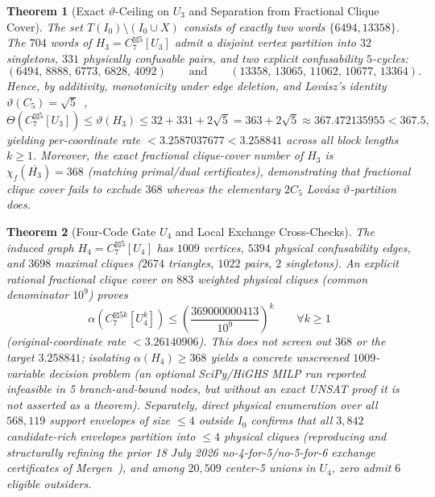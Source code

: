 \documentclass[11pt,letterpaper]{article}
\newtheorem{theorem}{Theorem}[section]
\theoremstyle{definition}
\theoremstyle{remark}
\newcommand{\ThetaCap}{\Theta}
\newcommand{\varthetaL}{\vartheta}
\begin{document}
\begin{theorem}[Exact $\varthetaL$-Ceiling on $U_3$ and Separation from Fractional Clique Cover]\label{thm:u3}
The set $T(I_0) \setminus (I_0 \cup X)$ consists of exactly two words $\{6494, 13358\}$. The $704$ words of $H_3 = C_7^{\boxtimes 5}[U_3]$ admit a disjoint vertex partition into $32$ singletons, $331$ physically confusable pairs, and two explicit confusability $5$-cycles:
\[
  (6494,\, 8888,\, 6773,\, 6828,\, 4092) \qquad \text{and} \qquad (13358,\, 13065,\, 11062,\, 10677,\, 13364).
\]
Hence, by additivity, monotonicity under edge deletion, and Lov\'asz's identity $\varthetaL(C_5)=\sqrt{5}$~\cite{Lovasz1979},
\begin{equation}\label{eq:u3-theta}
  \ThetaCap(C_7^{\boxtimes 5}[U_3]) \le \varthetaL(H_3) \le 32 + 331 + 2\sqrt{5} = 363 + 2\sqrt{5} \approx 367.472135955 < 367.5,
\end{equation}
yielding per-coordinate rate $< 3.2587037677 < 3.258841$ across all block lengths $k \ge 1$. Moreover, the exact fractional clique-cover number of $H_3$ is $\chi_f(\overline{H_3}) = 368$ (matching primal/dual certificates), demonstrating that fractional clique cover fails to exclude $368$ whereas the elementary $2C_5$ Lov\'asz $\varthetaL$-partition does.
\end{theorem}

\begin{theorem}[Four-Code Gate $U_4$ and Local Exchange Cross-Checks]\label{thm:u4}
The induced graph $H_4 = C_7^{\boxtimes 5}[U_4]$ has $1009$ vertices, $5394$ physical confusability edges, and $3698$ maximal cliques ($2674$ triangles, $1022$ pairs, $2$ singletons). An explicit rational fractional clique cover on $883$ weighted physical cliques (common denominator $10^9$) proves
\[
  \alpha(C_7^{\boxtimes 5k}[U_4^k]) \le \left(\frac{369000000413}{10^9}\right)^k \qquad \forall k \ge 1
\]
(original-coordinate rate $< 3.26140906$). This does \emph{not} screen out $368$ or the target $3.258841$; isolating $\alpha(H_4) \ge 368$ yields a concrete unscreened $1009$-variable decision problem (an optional SciPy/HiGHS MILP run reported infeasible in 5 branch-and-bound nodes, but without an exact UNSAT proof it is not asserted as a theorem). Separately, direct physical enumeration over all $568{,}119$ support envelopes of size $\le 4$ outside $I_0$ confirms that all $3{,}842$ candidate-rich envelopes partition into $\le 4$ physical cliques (reproducing and structurally refining the prior 18 July 2026 no-4-for-5/no-5-for-6 exchange certificates of Mergen~\cite{Mergen2026}), and among $20{,}509$ center-5 unions in $U_4$, zero admit $6$ eligible outsiders.
\end{theorem}
\end{document}
